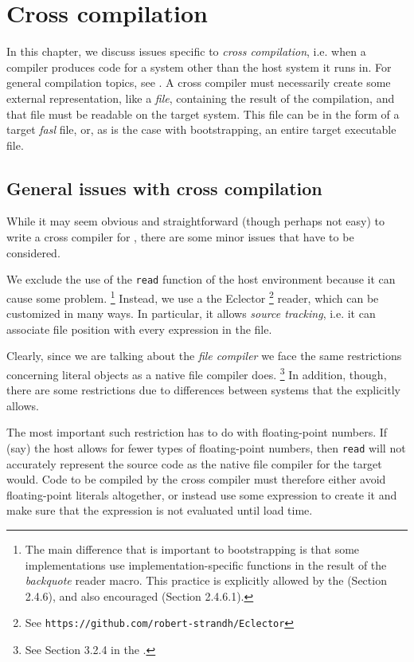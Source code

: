 \chapter{Cross compilation}
\label{chap-cross-compilation}

In this chapter, we discuss issues specific to \emph{cross
  compilation}, i.e. when a compiler produces code for a system other
than the host \commonlisp{} system it runs in.  For general
compilation topics, see .  A cross compiler
must necessarily create some external representation, like a
\emph{file}, containing the result of the compilation, and that file
must be readable on the target system.  This file can be in the form
of a target \emph{fasl} file, or, as is the case with \sysname{}
bootstrapping, an entire target executable file.

\section{General issues with cross compilation}

While it may seem obvious and straightforward (though perhaps not
easy) to write a cross compiler for \commonlisp{}, there are some minor issues
that have to be considered. 

We exclude the use of the \texttt{read} function of the host
environment because it can cause some problem.%
\footnote{The main difference that is important to bootstrapping is
  that some implementations use implementation-specific functions in
  the result of the \emph{backquote} reader macro.  This practice is
  explicitly allowed by the \hs{} (Section 2.4.6), and also encouraged
  (Section 2.4.6.1).}
Instead, we use a the Eclector%
\footnote{See \texttt{https://github.com/robert-strandh/Eclector}}
reader, which can be customized in many ways.  In particular, it
allows \emph{source tracking}, i.e. it can associate file position
with every expression in the file.

Clearly, since we are talking about the \emph{file compiler} we face
the same restrictions concerning literal objects as a native file
compiler does.%
\footnote{See Section 3.2.4 in the \hs{}.} %
In addition, though, there are some restrictions due to differences
between systems that the \hs{} explicitly allows.  

The most important such restriction has to do with floating-point
numbers.  If (say) the host allows for fewer types of floating-point
numbers, then \texttt{read} will not accurately represent the source
code as the native file compiler for the target would.  Code to be
compiled by the cross compiler must therefore either avoid
floating-point literals altogether, or instead use some expression to
create it and make sure that the expression is not evaluated until
load time.  

